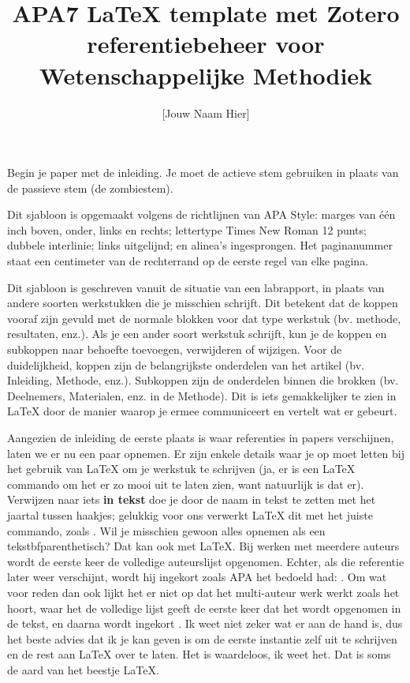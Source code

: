 \documentclass[stu,12pt,floatsintext]{apa7}
\title{APA7 \LaTeX{} template met Zotero referentiebeheer voor Wetenschappelijke Methodiek}  %
\author{[Jouw Naam Hier]}
\begin{document}
\maketitle  %


Begin je paper met de inleiding. 
Je moet de actieve stem gebruiken in plaats van de passieve stem (de zombiestem).

Dit sjabloon is opgemaakt volgens de richtlijnen van APA Style: marges van één inch boven, onder, links en rechts; lettertype Times New Roman 12 punts; dubbele interlinie; links uitgelijnd; en alinea's ingesprongen. 
Het paginanummer staat een centimeter van de rechterrand op de eerste regel van elke pagina.

Dit sjabloon is geschreven vanuit de situatie van een labrapport, in plaats van andere soorten werkstukken die je misschien schrijft. 
Dit betekent dat de koppen vooraf zijn gevuld met de normale blokken voor dat type werkstuk (bv. methode, resultaten, enz.). 
Als je een ander soort werkstuk schrijft, kun je de koppen en subkoppen naar behoefte toevoegen, verwijderen of wijzigen. 
Voor de duidelijkheid, koppen zijn de belangrijkste onderdelen van het artikel (bv. Inleiding, Methode, enz.). Subkoppen zijn de onderdelen binnen die brokken (bv. Deelnemers, Materialen, enz. in de Methode). 
Dit is iets gemakkelijker te zien in \LaTeX{} door de manier waarop je ermee communiceert en vertelt wat er gebeurt.

Aangezien de inleiding de eerste plaats is waar referenties in papers verschijnen, laten we er nu een paar opnemen. 
Er zijn enkele details waar je op moet letten bij het gebruik van LaTeX {} om je werkstuk te schrijven (ja, er is een LaTeX{} commando om het er zo mooi uit te laten zien, want natuurlijk is dat er). 
Verwijzen naar iets \textbf{in tekst} doe je door de naam in tekst te zetten met het jaartal tussen haakjes; gelukkig voor ons verwerkt \LaTeX{} dit met het juiste commando, zoals \textcite{Sample2024}. 
Wil je misschien gewoon alles opnemen als een tekstbf{parenthetisch}? 
Dat kan ook met \LaTeX{}. 
Bij werken met meerdere auteurs wordt de eerste keer de volledige auteurslijst opgenomen. 
Echter, als die referentie later weer verschijnt, wordt hij ingekort zoals APA het bedoeld had: \parencite{Multiauthor2020}.
Om wat voor reden dan ook lijkt het er niet op dat het multi-auteur werk \parencite[e.g.,][]{Multiauthor2020} werkt zoals het hoort, waar het de volledige lijst geeft de eerste keer dat het wordt opgenomen in de tekst, en daarna wordt ingekort \parencite{Multiauthor2020}. 
Ik weet niet zeker wat er aan de hand is, dus het beste advies dat ik je kan geven is om de eerste instantie zelf uit te schrijven en de rest aan LaTeX over te laten. 
Het is waardeloos, ik weet het. Dat is soms de aard van het beestje LaTeX.
\end{document}
